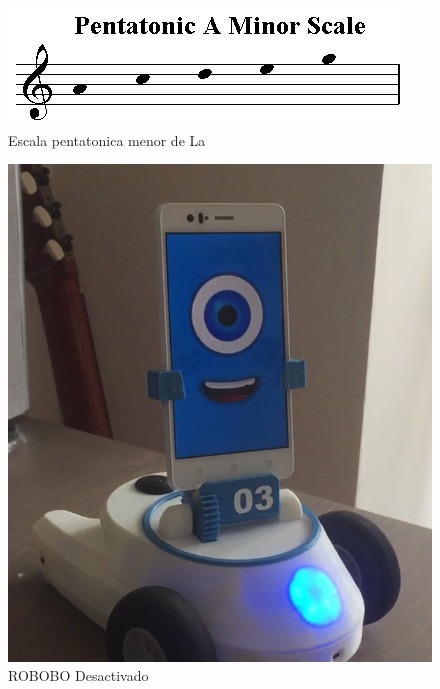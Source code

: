 \begin{figure}
	\centering
	\includegraphics[width=0.6\linewidth]{imagenes/pentatonic-scale-a-minor.jpg}
	\caption{Escala pentatonica menor de La}
	\label{fig:pentatonic-scale}
\end{figure} 

\begin{figure}[h]
\centering
\begin{minipage}{0.45\textwidth}
\centering
\includegraphics[width=1\linewidth]{imagenes/simon_normal.png}
\caption{ROBOBO Desactivado}
\label{fig:simon-normal}


\end{minipage}
\end{figure}
